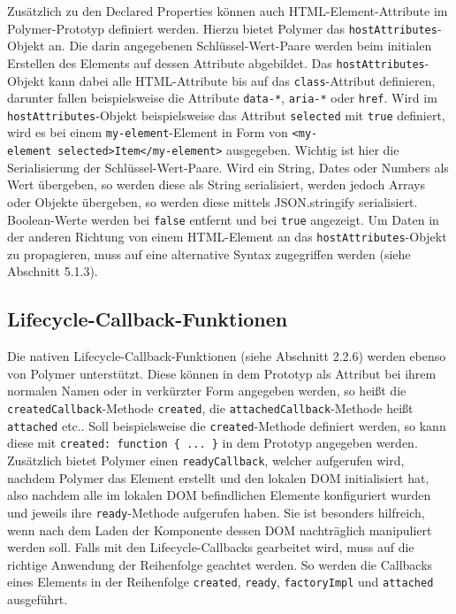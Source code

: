 Zusätzlich zu den Declared Properties können auch HTML-Element-Attribute
im Polymer-Prototyp definiert werden. Hierzu bietet Polymer das
\texttt{hostAttributes}-Objekt an. Die darin angegebenen
Schlüssel-Wert-Paare werden beim initialen Erstellen des Elements auf
dessen Attribute abgebildet. Das \texttt{hostAttributes}-Objekt kann
dabei alle HTML-Attribute bis auf das \texttt{class}-Attribut
definieren, darunter fallen beispielsweise die Attribute
\texttt{data-*}, \texttt{aria-*} oder \texttt{href}. Wird im
\texttt{hostAttributes}-Objekt beispielsweise das Attribut
\texttt{selected} mit \texttt{true} definiert, wird es bei einem
\texttt{my-element}-Element in Form von
\texttt{\textless{}my-element\ selected\textgreater{}Item\textless{}/my-element\textgreater{}}
ausgegeben. Wichtig ist hier die Serialisierung der
Schlüssel-Wert-Paare. Wird ein String, Dates oder Numbers als Wert
übergeben, so werden diese als String serialisiert, werden jedoch Arrays
oder Objekte übergeben, so werden diese mittels JSON.stringify
serialisiert. Boolean-Werte werden bei \texttt{false} entfernt und bei
\texttt{true} angezeigt. Um Daten in der anderen Richtung von einem
HTML-Element an das \texttt{hostAttributes}-Objekt zu propagieren, muss
auf eine alternative Syntax zugegriffen werden (siehe Abschnitt 5.1.3).

\subsection{Lifecycle-Callback-Funktionen}\label{lifecycle-callback-funktionen}

Die nativen Lifecycle-Callback-Funktionen (siehe Abschnitt 2.2.6) werden
ebenso von Polymer unterstützt. Diese können in dem Prototyp als
Attribut bei ihrem normalen Namen oder in verkürzter Form angegeben
werden, so heißt die \texttt{createdCallback}-Methode \texttt{created},
die \texttt{attachedCallback}-Methode heißt \texttt{attached} etc.. Soll
beispielsweise die \texttt{created}-Methode definiert werden, so kann
diese mit \texttt{created:\ function\ \{\ ...\ \}} in dem Prototyp
angegeben werden. Zusätzlich bietet Polymer einen
\texttt{readyCallback}, welcher aufgerufen wird, nachdem Polymer das
Element erstellt und den lokalen DOM initialisiert hat, also nachdem
alle im lokalen DOM befindlichen Elemente konfiguriert wurden und
jeweils ihre \texttt{ready}-Methode aufgerufen haben. Sie ist besonders
hilfreich, wenn nach dem Laden der Komponente dessen DOM nachträglich
manipuliert werden soll. Falls mit den Lifecycle-Callbacks gearbeitet
wird, muss auf die richtige Anwendung der Reihenfolge geachtet werden.
So werden die Callbacks eines Elements in der Reihenfolge
\texttt{created}, \texttt{ready}, \texttt{factoryImpl} und
\texttt{attached} ausgeführt.

